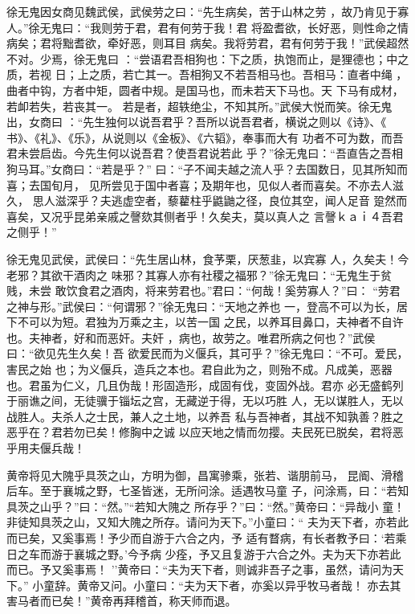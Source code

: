 \documentclass[]{article}
\begin{document}
徐无鬼因女商见魏武侯，武侯劳之曰：``先生病矣，苦于山林之劳
，故乃肯见于寡人。''徐无鬼曰：``我则劳于君，君有何劳于我！君
将盈耆欲，长好恶，则性命之情病矣；君将黜耆欲，牵好恶，则耳目
病矣。我将劳君，君有何劳于我！''武侯超然不对。少焉，徐无鬼曰
：``尝语君吾相狗也：下之质，执饱而止，是狸德也；中之质，若视
日；上之质，若亡其一。吾相狗又不若吾相马也。吾相马：直者中绳
，曲者中钩，方者中矩，圆者中规。是国马也，而未若天下马也。天
下马有成材，若卹若失，若丧其一。
若是者，超轶绝尘，不知其所。''武侯大悦而笑。徐无鬼出，女商曰
：``先生独何以说吾君乎？吾所以说吾君者，横说之则以《诗》、《
书》、《礼》、《乐》，从说则以《金板》、《六韬》，奉事而大有
功者不可为数，而吾君未尝启齿。今先生何以说吾君？使吾君说若此
乎？''徐无鬼曰：``吾直告之吾相狗马耳。''女商曰：``若是乎？''
曰：``子不闻夫越之流人乎？去国数日，见其所知而喜；去国旬月，
见所尝见于国中者喜；及期年也，见似人者而喜矣。不亦去人滋久，
思人滋深乎？夫逃虚空者，藜藋柱乎鼪鼬之径，良位其空，闻人足音
跫然而喜矣，又况乎昆弟亲戚之謦欬其侧者乎！久矣夫，莫以真人之
言謦ｋａｉ４吾君之侧乎！''

徐无鬼见武侯，武侯曰：``先生居山林，食芧栗，厌葱韭，以宾寡
人，久矣夫！今老邪？其欲干酒肉之
味邪？其寡人亦有社稷之福邪？''徐无鬼曰：``无鬼生于贫贱，未尝
敢饮食君之酒肉，将来劳君也。''君曰：``何哉！奚劳寡人？''曰：
``劳君之神与形。''武侯曰：``何谓邪？''徐无鬼曰：``天地之养也
一，登高不可以为长，居下不可以为短。君独为万乘之主，以苦一国
之民，以养耳目鼻口，夫神者不自许也。夫神者，好和而恶奸。夫奸
，病也，故劳之。唯君所病之何也？''武侯曰：``欲见先生久矣！吾
欲爱民而为义偃兵，其可乎？''徐无鬼曰：``不可。爱民，害民之始
也；为义偃兵，造兵之本也。君自此为之，则殆不成。凡成美，恶器
也。君虽为仁义，几且伪哉！形固造形，成固有伐，变固外战。君亦
必无盛鹤列于丽谯之间，无徒骥于锱坛之宫，无藏逆于得，无以巧胜
人，无以谋胜人，无以战胜人。夫杀人之士民，兼人之土地，以养吾
私与吾神者，其战不知孰善？胜之恶乎在？君若勿已矣！修胸中之诚
以应天地之情而勿撄。夫民死已脱矣，君将恶乎用夫偃兵哉！

黄帝将见大隗乎具茨之山，方明为御，昌寓骖乘，张若、谐朋前马，
昆阍、滑稽后车。至于襄城之野，七圣皆迷，无所问涂。适遇牧马童
子，问涂焉，曰：``若知具茨之山乎？''曰：``然。''``若知大隗之
所存乎？''曰：``然。''黄帝曰：``异哉小
童！非徒知具茨之山，又知大隗之所存。请问为天下。''小童曰：``
夫为天下者，亦若此而已矣，又奚事焉！予少而自游于六合之内，予
适有瞀病，有长者教予曰：`若乘日之车而游于襄城之野。'今予病
少痊，予又且复游于六合之外。夫为天下亦若此而已。予又奚事焉！
''黄帝曰：``夫为天下者，则诚非吾子之事，虽然，请问为天下。''
小童辞。黄帝又问。小童曰：``夫为天下者，亦奚以异乎牧马者哉！
亦去其害马者而已矣！''黄帝再拜稽首，称天师而退。
\end{document}

